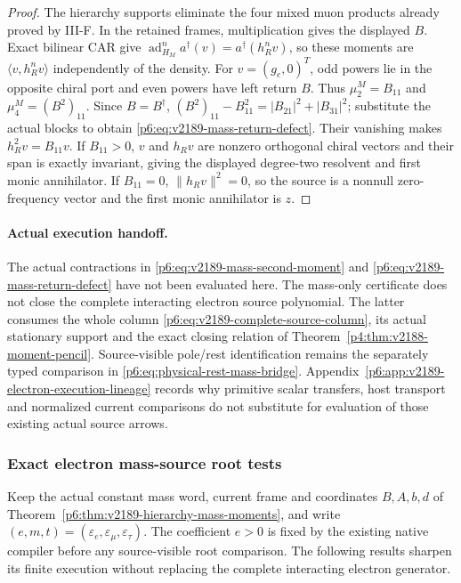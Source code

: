 \documentclass[12pt,a4paper]{article}
\begin{document}
\begin{proof}
The hierarchy supports eliminate the four mixed muon products already
proved by III-F. In the retained frames, multiplication gives the
displayed $B$. Exact bilinear CAR give
$\operatorname{ad}_{H_M}^n a^\dagger(v)=a^\dagger(h_R^n v)$, so these
moments are $\langle v,h_R^n v\rangle$ independently of the density.
For $v=(g_e,0)^T$, odd powers lie in the opposite chiral port and even
powers have left return $B$. Thus $\mu_2^M=B_{11}$ and
$\mu_4^M=(B^2)_{11}$. Since $B=B^\dagger$,
$(B^2)_{11}-B_{11}^2=|B_{21}|^2+|B_{31}|^2$; substitute the actual
blocks to obtain \eqref{p6:eq:v2189-mass-return-defect}.
Their vanishing makes $h_R^2v=B_{11}v$. If $B_{11}>0$, $v$ and $h_Rv$
are nonzero orthogonal chiral vectors and their span is exactly invariant,
giving the displayed degree-two resolvent and first monic annihilator.
If $B_{11}=0$, $\|h_Rv\|^2=0$, so the source is a nonnull zero-frequency
vector and the first monic annihilator is $z$.
\end{proof}

\paragraph{Actual execution handoff.}
The actual contractions in \eqref{p6:eq:v2189-mass-second-moment} and
\eqref{p6:eq:v2189-mass-return-defect} have not been evaluated here.
The mass-only certificate does not close the complete interacting
electron source polynomial. The latter consumes the whole column
\eqref{p6:eq:v2189-complete-source-column}, its actual stationary support
and the exact closing relation of
Theorem~\ref{p4:thm:v2188-moment-pencil}. Source-visible pole/rest
identification remains the separately typed comparison in
\eqref{p6:eq:physical-rest-mass-bridge}.
Appendix~\ref{p6:app:v2189-electron-execution-lineage} records why primitive
scalar transfers, host transport and normalized current comparisons do
not substitute for evaluation of those existing actual source arrows.




\subsubsection{Exact electron mass-source root tests}
\label{p6:sec:v2191-electron-mass-root}
Keep the actual constant mass word, current frame and coordinates
$B,A,b,d$ of Theorem~\ref{p6:thm:v2189-hierarchy-mass-moments}, and write
$(e,m,t)=(\varepsilon_e,\varepsilon_\mu,\varepsilon_\tau)$.
The coefficient $e>0$ is fixed by the existing native compiler before any
source-visible root comparison. The following results sharpen its finite
execution without replacing the complete interacting electron generator.
\end{document}
